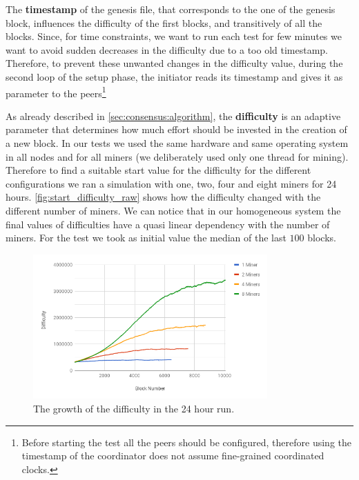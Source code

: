 The \textbf{timestamp} of the genesis file, that corresponds to the one of the
genesis block, influences the difficulty of the first blocks, and transitively
of all the blocks.
Since, for time constraints, we want to run each test for few minutes we want
to avoid sudden decreases in the difficulty due to a too old timestamp.
Therefore, to prevent these unwanted changes in the difficulty value, during the
second loop of the setup phase, the initiator reads its timestamp and gives it
as parameter to the peers\footnote{Before starting the test all the
peers should be configured, therefore using the timestamp of the coordinator
does not assume fine-grained coordinated clocks.}

As already described in \autoref{sec:consensus:algorithm}, the
\textbf{difficulty} is an adaptive parameter  that determines how much effort
should be invested in the creation of a new block. In our tests we used the same
hardware and same operating system in all nodes and for all miners (we
deliberately used only one thread for mining). Therefore to find a suitable
start value for the difficulty for the different configurations we ran a
simulation with one, two, four and eight miners for 24 hours.
\autoref{fig:start_difficulty_raw} shows how the difficulty changed with the
different number of miners. We can notice that in our homogeneous system the
final values of difficulties have a quasi linear dependency with the number of
miners. For the test we took as initial value the median of the last $100$
blocks.
\begin{figure}
    \begin{center}
        \includegraphics[width=0.8\textwidth]{./res/img/start_difficulty_all.png}
        \caption{The growth of the difficulty in the 24 hour run.}
        \label{fig:start_difficulty_raw}
    \end{center}
\end{figure}

